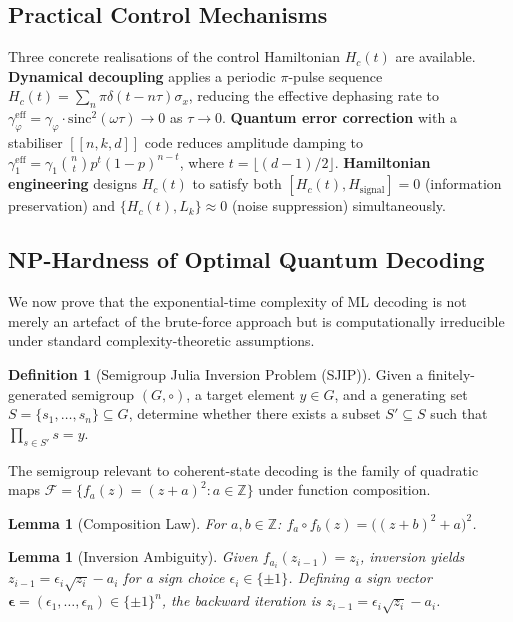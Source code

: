 \documentclass[journal,twocolumn]{IEEEtran}
\theoremstyle{definition}
\newtheorem{definition}{Definition}[section]
\theoremstyle{plain}
\newtheorem{lemma}[theorem]{Lemma}
\newcommand{\Z}{\mathbb{Z}}
\begin{document}
\subsection{Practical Control Mechanisms}

Three concrete realisations of the control Hamiltonian $H_c(t)$
are available.  \textbf{Dynamical decoupling} applies a periodic
$\pi$-pulse sequence $H_c(t) = \sum_n \pi\delta(t-n\tau)\sigma_x$,
reducing the effective dephasing rate to
$\gamma_\varphi^{\mathrm{eff}} = \gamma_\varphi
\cdot \mathrm{sinc}^2(\omega\tau) \to 0$ as $\tau \to 0$.
\textbf{Quantum error correction} with a stabiliser $[[n,k,d]]$
code reduces amplitude damping to
$\gamma_1^{\mathrm{eff}} = \gamma_1 \binom{n}{t} p^t (1-p)^{n-t}$,
where $t = \lfloor(d-1)/2\rfloor$.  \textbf{Hamiltonian
engineering} designs $H_c(t)$ to satisfy both
$[H_c(t), H_{\mathrm{signal}}] = 0$ (information preservation)
and $\{H_c(t), L_k\} \approx 0$ (noise suppression) simultaneously.

\subsection{NP-Hardness of Optimal Quantum Decoding}
\label{sec:sjip}

We now prove that the exponential-time complexity of ML decoding is
not merely an artefact of the brute-force approach but is
computationally irreducible under standard complexity-theoretic
assumptions.

\begin{definition}[Semigroup Julia Inversion Problem (SJIP)]
\label{def:sjip}
Given a finitely-generated semigroup $(G,\circ)$, a target element
$y \in G$, and a generating set $S = \{s_1, \ldots, s_n\} \subseteq G$,
determine whether there exists a subset $S' \subseteq S$ such that
$\prod_{s \in S'} s = y$.
\end{definition}

The semigroup relevant to coherent-state decoding is the family of
quadratic maps $\mathcal{F} = \{f_a(z) = (z+a)^2 : a \in \Z\}$
under function composition.

\begin{lemma}[Composition Law]
\label{lem:composition}
For $a, b \in \Z$: $f_a \circ f_b(z) = \bigl((z+b)^2 + a\bigr)^2$.
\end{lemma}

\begin{lemma}[Inversion Ambiguity]
\label{lem:inversion}
Given $f_{a_i}(z_{i-1}) = z_i$, inversion yields
$z_{i-1} = \epsilon_i \sqrt{z_i} - a_i$ for a sign choice
$\epsilon_i \in \{\pm 1\}$.  Defining a sign vector
$\boldsymbol\epsilon = (\epsilon_1, \ldots, \epsilon_n) \in
\{\pm1\}^n$, the backward iteration is
$z_{i-1} = \epsilon_i\sqrt{z_i} - a_i$.
\end{lemma}
\end{document}
